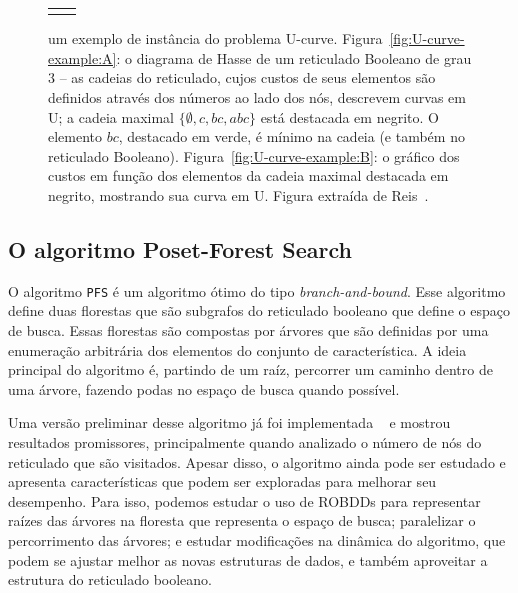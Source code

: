 \documentclass[12pt]{article}
\begin{document}
\begin{figure}[!ht]
\begin{tabular}{c c}
{        \label{fig:U-curve-example:B} 
    }
\end{tabular}
\caption{um exemplo de instância do problema U-curve. 
Figura~\ref{fig:U-curve-example:A}: o diagrama de Hasse de um reticulado
Booleano de grau $3$ -- as cadeias do reticulado, cujos custos de seus
elementos são definidos através dos números ao lado dos nós, descrevem
curvas em U; a cadeia maximal $\{ \emptyset, c, bc, abc \}$ está
destacada em negrito. O elemento $bc$, destacado em verde, é mínimo na
cadeia (e também no reticulado Booleano). 
Figura~\ref{fig:U-curve-example:B}: o gráfico dos custos em função dos
elementos da cadeia maximal destacada em negrito, mostrando sua curva em
U. Figura extraída de Reis~\cite{msreis thesis}.} 
    \label{fig:U-curve} 
\end{figure}


\subsection{O algoritmo Poset-Forest Search}
O algoritmo {\tt PFS} é um algoritmo ótimo do tipo 
{\em branch-and-bound}. Esse algoritmo define duas florestas que são 
subgrafos do reticulado booleano que define o espaço de busca. Essas
florestas são compostas por árvores que são definidas por uma enumeração
arbitrária dos elementos do conjunto de característica. A ideia 
principal do algoritmo é, partindo de um raíz, percorrer um caminho 
dentro de uma árvore, fazendo podas no espaço de busca quando possível.

Uma versão preliminar desse algoritmo já foi implementada 
~\cite{msreis thesis} e mostrou resultados promissores, principalmente
quando analizado o número de nós do reticulado que são visitados. Apesar
disso, o algoritmo ainda pode ser estudado e apresenta características
que podem ser exploradas para melhorar seu desempenho. Para isso, 
podemos estudar o uso de ROBDDs para representar raízes das árvores na
floresta que representa o espaço de busca; paralelizar o percorrimento 
das árvores; e estudar modificações na dinâmica do algoritmo, que podem
se ajustar melhor as novas estruturas de dados, e também aproveitar
a estrutura do reticulado booleano.
\end{document}
